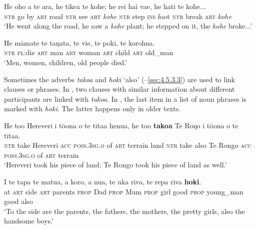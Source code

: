 \ea\label{ex:11.1}
\gll He oho a te ara, he tike{\ꞌ}a te kohe; he rei hai va{\ꞌ}e, he hati te kohe... \\
\textsc{ntr} go by \textsc{art} road \textsc{ntr} see \textsc{art} \textit{kohe} \textsc{ntr} step \textsc{ins} foot \textsc{ntr} break \textsc{art} \textit{kohe} \\

\glt 
‘He went along the road, he saw a \textit{kohe} plant; he stepped on it, the \textit{kohe} broke...’ \textstyleExampleref{[Ley-2-01.018]}
\z

\ea\label{ex:11.2}
\gll He māmate te taŋata, te vi{\ꞌ}e, te poki, te korohu{\ꞌ}a. \\
\textsc{ntr} \textsc{pl}:die \textsc{art} man \textsc{art} woman \textsc{art} child \textsc{art} old\_man \\

\glt
‘Men, women, children, old people died.’ \textstyleExampleref{[Ley-2-01.010]}
\z

Sometimes the adverbs \textit{tako{\ꞌ}a} and \textit{hoki} ‘also’ (–\ref{sec:4.5.3.3}) are used to link clauses or phrases. In , two clauses with similar information about different participants are linked with \textit{tako{\ꞌ}a}. In , the last item in a list of noun phrases is marked with \textit{hoki}. The latter happens only in older texts.

\ea\label{ex:11.3}
\gll He to{\ꞌ}o Hereveri i tō{\ꞌ}ona o te tīta{\ꞌ}a henua, he to{\ꞌ}o \textbf{tako{\ꞌ}a}  Te Roŋo i tō{\ꞌ}ona o te tīta{\ꞌ}a.\\
\textsc{ntr} take Hereveri \textsc{acc} \textsc{poss.3sg.o} of \textsc{art} terrain land \textsc{ntr} take also  Te Rongo \textsc{acc} \textsc{poss.3sg.o} of \textsc{art} terrain\\

\glt 
‘Hereveri took his piece of land; Te Rongo took his piece of land as well.’ \textstyleExampleref{[Egt-02.045]}
\z

\ea\label{ex:11.4}
\gll {\ꞌ}I te tapa te matu{\ꞌ}a, a koro, a nua, te uka riva,  te repa riva \textbf{hoki}.\\
at \textsc{art} side \textsc{art} parents \textsc{prop} Dad \textsc{prop} Mum \textsc{prop} girl good  \textsc{prop} young\_man good also\\

\glt 
‘To the side are the parents, the fathers, the mothers, the pretty girls, also the handsome boys.’ \textstyleExampleref{[Ley-5-24.013]}
\z

